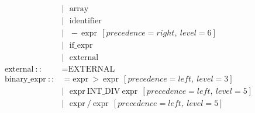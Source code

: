 \documentclass[a4paper,12pt]{book} %
\begin{document}
\begin{align*}
                                      & |\ \ \ \text{array}                                                                                                                                                                                                       \\
                                      & |\ \ \ \text{identifier}                                                                                                                                                                                                  \\
                                      & |\ \ \ -\ \text{expr}\ \ [precedence=right,\ level=6]                                                                                                                                                                     \\
                                      & |\ \ \ \text{if\_expr}                                                                                                                                                                                                    \\
                                      & |\ \ \ \text{external}                                                                                                                                                                                                    \\
  \text{external}\ ::                 & = \text{EXTERNAL}                                                                                                                                                                                                         \\
  \text{binary\_expr}\ ::             & = \text{expr}\ >\ \text{expr}\ \ [precedence=left,\ level=3]                                                                                                                                                              \\
                                      & |\ \ \ \text{expr}\ \text{INT\_DIV}\ \text{expr}\ \ [precedence=left,\ level=5]                                                                                                                                           \\
                                      & |\ \ \ \text{expr}\ /\ \text{expr}\ \ [precedence=left,\ level=5]                                                                                                                                                         \\

\end{align*}
\end{document}
